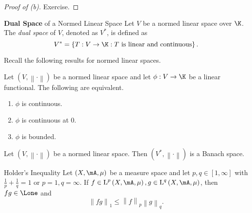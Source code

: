 \documentclass[pmath451]{subfiles}
\begin{document}
    \begin{proof}[Proof of (b)]
        Exercise.
    \end{proof}
    
    \begin{recall}{\textbf{Dual Space} of a Normed Linear Space}
        Let $V$ be a normed linear space over $\K$. The \emph{dual space} of $V$, denoted as $V^{*}$, is defined as
        \begin{equation*}
            V^{*} = \left\lbrace T:V\to\K: \text{$T$ is linear and continuous} \right\rbrace.
        \end{equation*}
    \end{recall}
    
    \np Recall the following results for normed linear spaces.

    \begin{prop}{}
        Let $\left( V,\left\lVert \cdot\right\rVert \right)$ be a normed linear space and let $\phi:V\to\K$ be a linear functional. The following are equivalent.
        \begin{enumerate}
            \item $\phi$ is continuous.
            \item $\phi$ is continuous at $0$.
            \item $\phi$ is bounded.
        \end{enumerate}
    \end{prop}
    
    \rruleline

    \begin{prop}{}
        Let $\left( V,\left\lVert \cdot\right\rVert \right)$ be a normed linear space. Then $\left( V^{*},\left\lVert \cdot\right\rVert \right)$ is a Banach space.
    \end{prop}

    \rruleline
    
    \begin{theorem}{Holder's Inequality}
        Let $\left( X,\mA,\mu \right)$ be a measure space and let $p,q\in\left[ 1,\infty \right]$ with $\frac{1}{p}+\frac{1}{q} = 1$ or $p=1,q=\infty$. If $f\in\LLL^p\left( X,\mA,\mu \right), g\in\LLL^q\left( X,\mA,\mu \right)$, then $fg\in\Lone$ and
        \begin{equation*}
            \left\lVert fg \right\rVert_{1}\leq\left\lVert f\right\rVert_p\left\lVert g\right\rVert_q.
        \end{equation*}
    \end{theorem}
\end{document}
